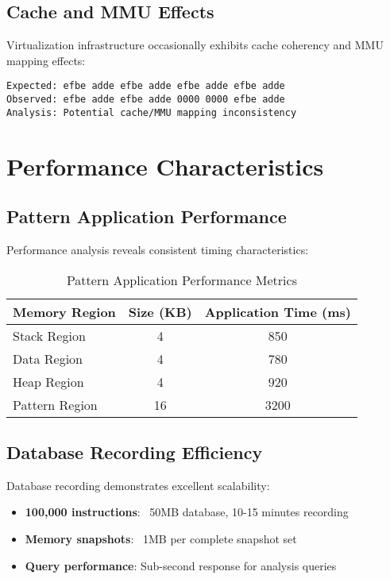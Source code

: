 \documentclass[11pt,a4paper]{article}
\begin{document}
\subsection{Cache and MMU Effects}

Virtualization infrastructure occasionally exhibits cache coherency and MMU mapping effects:

\begin{lstlisting}[style=hexdump, caption=Cache Coherency Effects]
Expected: efbe adde efbe adde efbe adde efbe adde
Observed: efbe adde efbe adde 0000 0000 efbe adde
Analysis: Potential cache/MMU mapping inconsistency
\end{lstlisting}

\section{Performance Characteristics}

\subsection{Pattern Application Performance}

Performance analysis reveals consistent timing characteristics:

\begin{table}[H]
\centering
\begin{tabular}{@{}lcc@{}}
\toprule
\textbf{Memory Region} & \textbf{Size (KB)} & \textbf{Application Time (ms)} \\
\midrule
Stack Region       & 4   & 850  \\
Data Region        & 4   & 780  \\
Heap Region        & 4   & 920  \\
Pattern Region     & 16  & 3200 \\
\bottomrule
\end{tabular}
\caption{Pattern Application Performance Metrics}
\label{tab:performance}
\end{table}

\subsection{Database Recording Efficiency}

Database recording demonstrates excellent scalability:

\begin{itemize}
    \item \textbf{100,000 instructions}: ~50MB database, 10-15 minutes recording
    \item \textbf{Memory snapshots}: ~1MB per complete snapshot set
    \item \textbf{Query performance}: Sub-second response for analysis queries
\end{itemize}
\end{document}
